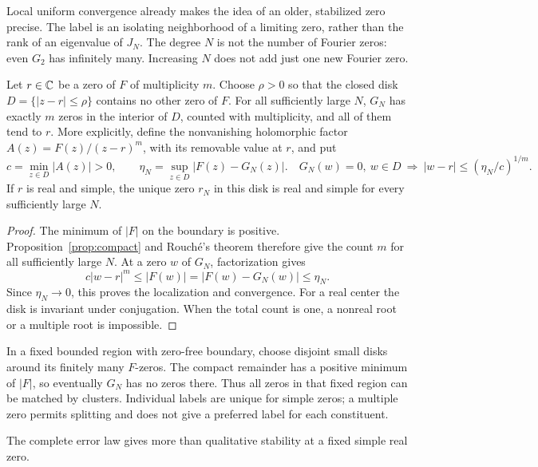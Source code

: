 Local uniform convergence already makes the idea of an older,
stabilized zero precise. The label is an isolating neighborhood of a
limiting zero, rather than the rank of an eigenvalue of \(J_N\).
The degree \(N\) is not the number of Fourier zeros: even \(G_2\)
has infinitely many. Increasing \(N\) does not add just one new
Fourier zero.

\begin{proposition}
\label{prop:fixed-cluster}
Let \(r\in\mathbb C\) be a zero of \(F\) of multiplicity \(m\).
Choose \(\rho>0\) so that the closed disk \(D=\{|z-r|\le\rho\}\)
contains no other zero of \(F\). For all sufficiently large \(N\),
\(G_N\) has exactly \(m\) zeros in the interior of \(D\), counted
with multiplicity, and all of them tend to \(r\).
More explicitly, define the nonvanishing holomorphic factor
\(A(z)=F(z)/(z-r)^m\), with its removable value at \(r\), and put
\begin{equation}
 c=\min_{z\in D}|A(z)|>0,\qquad
 \eta_N=\sup_{z\in D}|F(z)-G_N(z)|.
 \quad
 G_N(w)=0,\ w\in D
 \ \Longrightarrow\
 |w-r|\le(\eta_N/c)^{1/m}.
 \label{eq:cluster-localization}
\end{equation}
If \(r\) is real and simple, the unique zero \(r_N\) in this disk
is real and simple for every sufficiently large \(N\).
\end{proposition}

\begin{proof}
The minimum of \(|F|\) on the boundary is positive.
Proposition~\ref{prop:compact} and Rouch\'e's theorem therefore give
the count \(m\) for all sufficiently large \(N\).
At a zero \(w\) of \(G_N\), factorization gives
\[
 c|w-r|^m\le|F(w)|=|F(w)-G_N(w)|\le\eta_N.
\]
Since \(\eta_N\to0\), this proves the localization and convergence.
For a real center the disk is invariant under conjugation.
When the total count is one, a nonreal root or a multiple root is
impossible.
\end{proof}

In a fixed bounded region with zero-free boundary, choose disjoint
small disks around its finitely many \(F\)-zeros. The compact
remainder has a positive minimum of \(|F|\), so eventually \(G_N\)
has no zeros there. Thus all zeros in that fixed region can be
matched by clusters. Individual labels are unique for simple zeros;
a multiple zero permits splitting and does not give a preferred
label for each constituent.

The complete error law gives more than qualitative stability at a
fixed simple real zero.

